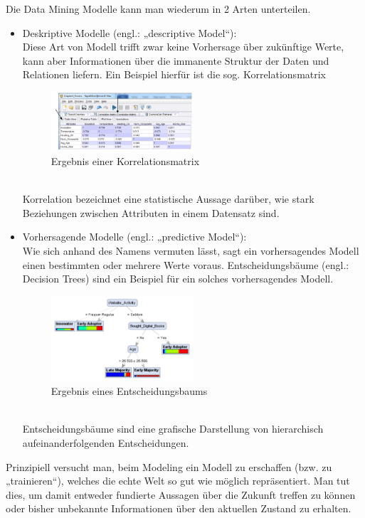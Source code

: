 Die Data Mining Modelle kann man wiederum in 2 Arten unterteilen.
\begin{itemize}
  \item Deskriptive Modelle (engl.: „descriptive Model“): \\
  Diese Art von Modell trifft zwar keine Vorhersage über zukünftige Werte, kann
  aber Informationen über die immanente Struktur der Daten und Relationen
  liefern. Ein Beispiel hierfür ist die sog. Korrelationsmatrix
  \begin{figure}[htb]
    \centering
  	\includegraphics[width=0.5\textwidth]{gfx/correlationmatrix.png}
  	\caption{Ergebnis einer Korrelationsmatrix \cite{North:2012}}
  	\label{fig:process:crispdm:mod:cm}
  \end{figure}
  \\
  Korrelation bezeichnet eine statistische Aussage darüber, wie stark Beziehungen
  zwischen Attributen in einem Datensatz sind.
  \item Vorhersagende Modelle (engl.: „predictive Model“): \\
  Wie sich anhand des Namens vermuten lässt, sagt ein vorhersagendes Modell
  einen bestimmten oder mehrere Werte voraus. Entscheidungsbäume (engl.: Decision
  Trees) sind ein Beispiel für ein solches vorhersagendes Modell.
  \pagebreak
  \begin{figure}[htb]
    \centering
  	\includegraphics[width=0.5\textwidth]{gfx/dectree.png}
  	\caption{Ergebnis eines Entscheidungsbaums \cite{North:2012}}
  	\label{fig:process:crispdm:mod:dt}
  \end{figure}
  \\
  Entscheidungsbäume sind eine grafische Darstellung von  hierarchisch
  aufeinanderfolgenden Entscheidungen.
\end{itemize}
Prinzipiell versucht man, beim Modeling ein Modell zu erschaffen (bzw. zu
„trainieren“), welches die echte Welt so gut wie möglich repräsentiert. Man tut
dies, um damit entweder fundierte Aussagen über die Zukunft treffen zu können
oder bisher unbekannte Informationen über den aktuellen Zustand zu erhalten.

